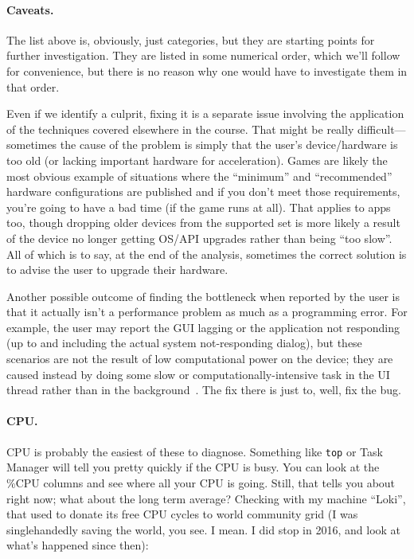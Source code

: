 \paragraph{Caveats.}
The list above is, obviously, just categories, but they are starting points for further investigation. They are listed in some numerical order, which we'll follow for convenience, but there is no reason why one would have to investigate them in that order. 

Even if we identify a culprit, fixing it is a separate issue involving the application of the techniques covered elsewhere in the course. That might be really difficult---sometimes the cause of the problem is simply that the user's device/hardware is too old (or lacking important hardware for acceleration). Games are likely the most obvious example of situations where the ``minimum'' and ``recommended'' hardware configurations are published and if you don't meet those requirements, you're going to have a bad time (if the game runs at all). That applies to apps too, though dropping older devices from the supported set is more likely a result of the device no longer getting OS/API upgrades rather than being ``too slow''. All of which is to say, at the end of the analysis, sometimes the correct solution is to advise the user to upgrade their hardware.

Another possible outcome of finding the bottleneck when reported by the user is that it actually isn't a performance problem as much as a programming error. For example, the user may report the GUI lagging or the application not responding (up to and including the actual system not-responding dialog), but these scenarios are not the result of low computational power on the device; they are caused instead by doing some slow or computationally-intensive task in the UI thread rather than in the background~\cite{bottlenecks-android}. The fix there is just to, well, fix the bug.


\paragraph{CPU.} CPU is probably the easiest of these to diagnose. Something like \texttt{top} or Task Manager will tell you pretty quickly if the CPU is busy. You can look at the \%CPU columns and see where all your CPU is going. Still, that tells you about right now; what about the long term average? Checking with my machine ``Loki'', that used to donate its free CPU cycles to world community grid (I was singlehandedly saving the world, you see. I mean. I did stop in 2016, and look at what's happened since then):

